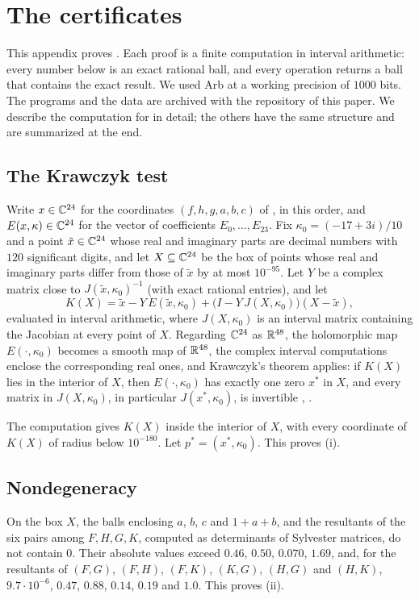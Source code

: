 \section{The certificates}\label{app:cert114}

This appendix proves
.
Each proof is a finite computation in interval arithmetic: every number below is an exact
rational ball, and every operation returns a ball that contains the exact
result. We used Arb \cite{Joh17} at a working precision of $1000$ bits. The
programs and the data are archived with the repository of this paper. We
describe the computation for  in detail; the others
have the same structure and are summarized at the end.

\subsection*{The Krawczyk test}
Write $x\in\mathbb{C}^{24}$ for the coordinates $(f,h,g,a,b,c)$ of
, in this order, and $E(x,\kappa)\in\mathbb{C}^{24}$ for
the vector of coefficients $E_{0},\dots,E_{23}$. Fix
$\kappa_{0}=(-17+3i)/10$ and a point $\tilde x\in\mathbb{C}^{24}$ whose real and
imaginary parts are decimal numbers with $120$ significant digits, and let
$X\subseteq\mathbb{C}^{24}$ be the box of points whose real and imaginary parts
differ from those of $\tilde x$ by at most $10^{-95}$. Let $Y$ be a complex
matrix close to $J(\tilde x,\kappa_{0})^{-1}$ (with exact rational entries),
and let
\[
  K(X)=\tilde x-Y\,E(\tilde x,\kappa_{0})+\bigl(I-Y\,J(X,\kappa_{0})\bigr)
  (X-\tilde x),
\]
evaluated in interval arithmetic, where $J(X,\kappa_{0})$ is an interval
matrix containing the Jacobian at every point of $X$. Regarding $\mathbb{C}^{24}$
as $\mathbb{R}^{48}$, the holomorphic map $E(\cdot,\kappa_{0})$ becomes a smooth
map of $\mathbb{R}^{48}$, the complex interval computations enclose the
corresponding real ones, and Krawczyk's theorem applies: if $K(X)$ lies in
the interior of $X$, then $E(\cdot,\kappa_{0})$ has exactly one zero $x^{*}$
in $X$, and every matrix in $J(X,\kappa_{0})$, in particular
$J(x^{*},\kappa_{0})$, is invertible \cite{Kra69,Moo77}, \cite[\S5.1]{Neu90}.

The computation gives $K(X)$ inside the interior of $X$, with every
coordinate of $K(X)$ of radius below $10^{-180}$. Let $p^{*}=(x^{*},
\kappa_{0})$. This proves (i).

\subsection*{Nondegeneracy}
On the box $X$, the balls enclosing $a$, $b$, $c$ and $1+a+b$, and the
resultants of the six pairs among $F,H,G,K$, computed as determinants of
Sylvester matrices, do not contain $0$. Their absolute values exceed
$0.46$, $0.50$, $0.070$, $1.69$, and, for the resultants of $(F,G)$, $(F,H)$,
$(F,K)$, $(K,G)$, $(H,G)$ and $(H,K)$, $9.7\cdot10^{-6}$, $0.47$, $0.88$,
$0.14$, $0.19$ and $1.0$. This proves (ii).

